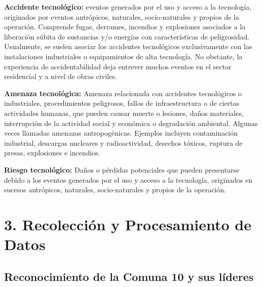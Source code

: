 \documentclass[
  letterpaper,
]{book}
\begin{document}
\begin{tcolorbox}[enhanced jigsaw, colback=white, opacityback=0, bottomtitle=1mm, toprule=.15mm, colbacktitle=quarto-callout-note-color!10!white, titlerule=0mm, toptitle=1mm, breakable, leftrule=.75mm, coltitle=black, arc=.35mm, opacitybacktitle=0.6, colframe=quarto-callout-note-color-frame, left=2mm, title=\textcolor{quarto-callout-note-color}{\faInfo}\hspace{0.5em}{Glosario de términos relacionados con el riesgo tecnológico}, bottomrule=.15mm, rightrule=.15mm]

\textbf{Accidente tecnológico:} eventos generados por el uso y acceso a
la tecnología, originados por eventos antrópicos, naturales,
socio-naturales y propios de la operación. Comprende fugas, derrames,
incendios y explosiones asociados a la liberación súbita de sustancias
y/o energías con características de peligrosidad. Usualmente, se suelen
asociar los accidentes tecnológicos exclusivamente con las instalaciones
industriales o equipamientos de alta tecnología. No obstante, la
experiencia de accidentabilidad deja entrever muchos eventos en el
sector residencial y a nivel de obras civiles.

\textbf{Amenaza tecnológica:} Amenaza relacionada con accidentes
tecnológicos o industriales, procedimientos peligrosos, fallos de
infraestructura o de ciertas actividades humanas, que pueden causar
muerte o lesiones, daños materiales, interrupción de la actividad social
y económica o degradación ambiental. Algunas veces llamadas amenazas
antropogénicas. Ejemplos incluyen contaminación industrial, descargas
nucleares y radioactividad, desechos tóxicos, ruptura de presas,
explosiones e incendios.

\textbf{Riesgo tecnológico:} Daños o pérdidas potenciales que pueden
presentarse debido a los eventos generados por el uso y acceso a la
tecnología, originados en sucesos antrópicos, naturales, socio-naturales
y propios de la operación.

\end{tcolorbox}


\chapter{3. Recolección y Procesamiento de
Datos}\label{recolecciuxf3n-y-procesamiento-de-datos}

\section{Reconocimiento de la Comuna 10 y sus
líderes}\label{reconocimiento-de-la-comuna-10-y-sus-luxedderes}
\end{document}
